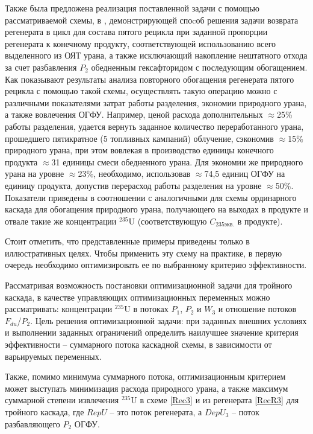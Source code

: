 Также была предложена реализация поставленной задачи с помощью рассматриваемой схемы, в \cite{gusevMultycascadeEnrichmentSchemes2020}, демонстрирующей споcоб решения задачи возврата регенерата в цикл для состава пятого рецикла при заданной пропорции регенерата к конечному продукту, соответствующей использованию всего выделенного из ОЯТ урана, а также исключающий накопление нештатного отхода за счет разбавления $P_2$ обедненным гексафторидом с последующим обогащением. Как показывают результаты анализа повторного обогащения регенерата пятого рецикла с помощью такой схемы, осуществлять такую операцию можно с различными показателями затрат работы разделения, экономии природного урана, а также вовлечения ОГФУ. Например, ценой расхода дополнительных $\approx$25\% работы разделения, удается вернуть заданное количество переработанного урана, прошедшего пятикратное (5 топливных кампаний) облучение, сэкономив $\approx$15\% природного урана, при этом вовлекая в производство единицы конечного продукта $\approx$31 единицы смеси обедненного урана. Для экономии же природного урана на уровне $\approx$23\%, необходимо, использовав $\approx$74,5 единиц ОГФУ на единицу продукта, допустив перерасход работы разделения на уровне $\approx$50\%. Показатели приведены в соотношении с аналогичными для схемы ординарного каскада для обогащения природного урана, получающего на выходах в продукте и отвале такие же концентрации $^{235}$U (соответствующую $C_{235 экв.}$ в продукте).


Стоит отметить, что представленные примеры приведены только в иллюстративных целях. Чтобы применить эту схему на практике, в первую очередь необходимо оптимизировать ее по выбранному критерию эффективности.

Рассматривая возможность постановки оптимизационной задачи для тройного каскада, в качестве управляющих оптимизационных переменных можно рассматривать: концентрации $^{235}$U в потоках $P_1$, $P_2$ и $W_3$ и отношение потоков $F_{du}$/$P_2$.
Цель решения оптимизационной задачи: при заданных внешних условиях и выполнении заданных ограничений определить наилучшее значение критерия эффективности -- суммарного потока каскадной схемы, в зависимости от варьируемых переменных.

Также, помимо минимума суммарного потока, оптимизационным критерием может выступать минимизация расхода природного урана, а также максимум суммарной степени извлечения $^{235}$U в схеме \ref{Rec3} и из регенерата \ref{RecR3} для тройного каскада, где $RepU$ -- это поток регенерата, а $DepU_{3}$ -- поток разбавляющего $P_2$ ОГФУ.


